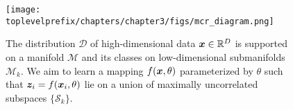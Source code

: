 \documentclass[../../book-main.tex]{subfiles}
\begin{document}
\begin{figure}
	\centering
	\texttt{[image: \\toplevelprefix/chapters/chapter3/figs/mcr\_diagram.png]}
	\caption{The distribution $\mathcal D$ of high-dimensional data $\bm{x}\in \mathbb{R}^D$ is supported on  a manifold $\mathcal{M}$ and its classes on low-dimensional submanifolds $\mathcal{M}_k$. We aim to learn a mapping $f(\bm{x}, \theta)$ parameterized by $\theta$ such that $\bm{z}_i = f(\bm{x}_i, \theta)$ lie on a union of maximally uncorrelated subspaces $\{\mathcal{S}_k\}$.}
	\label{chap4-fig:mcr-diagram}
\end{figure}
\end{document}
